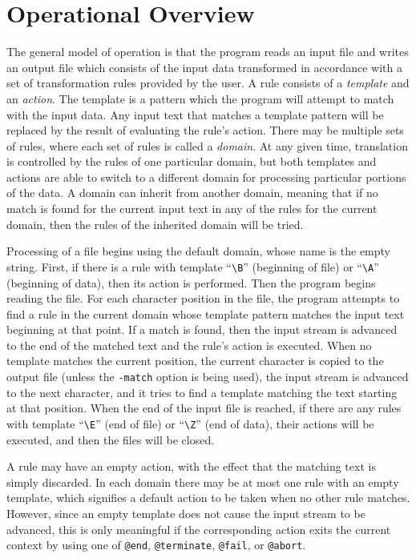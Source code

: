

\section{Operational Overview}

The general model of operation is that the program reads an input file
and writes an output file which consists of the input data transformed in
accordance with a set of transformation rules provided by the user.
A rule consists of a {\em template} and an {\em action}.  The template
is a pattern which the program will attempt to match with the input data.
Any input text that matches a template pattern will be replaced by the
result of evaluating the rule's action.  There may be multiple sets of
rules, where each set of rules is called a {\em domain}.  At any given
time, translation is controlled by the rules of one particular domain, but
both templates and actions are able to switch to a different domain for
processing particular portions of the data.  A domain can inherit from
another domain, meaning that if no match is found for the current input
text in any of the rules for the current domain, then the rules of the
inherited domain will be tried.

Processing of a file begins using the default domain, whose name is the
empty string.  First, if there is a rule with template ``\verb/\B/''
(beginning of file) or ``\verb/\A/'' (beginning of data), then its action
is performed.  Then the program begins reading the file.  For each
character position in the file, the program attempts to find a rule in
the current domain whose template pattern matches the input text
beginning at that point.  If a match is found, then the input stream is
advanced to the end of the matched text and the rule's action is
executed.  When no template matches the current position, the current
character is copied to the output file (unless the \verb/-match/ option
is being used), the input stream is advanced to the next character, and
it tries to find a template matching the text starting at that position.
When the end of the input file is reached, if there are any rules with
template ``\verb/\E/'' (end of file) or ``\verb/\Z/'' (end of data),
their actions will be executed, and then the files will be closed.

A rule may have an empty action, with the effect that the matching text
is simply discarded.  In each domain there may be at most one rule with
an empty template, which signifies a default action to be taken when no
other rule matches.  However, since an empty template does not cause the
input stream to be advanced, this is only meaningful if the
corresponding action exits the current context by using one of
\verb/@end/, \verb/@terminate/, \verb/@fail/, or \verb/@abort/.

